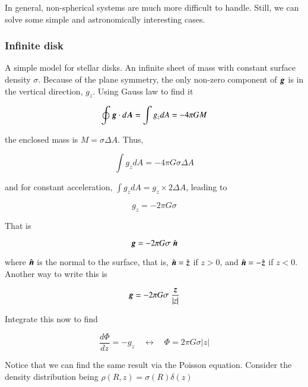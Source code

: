 In general, non-spherical systems are much more difficult to handle. Still, we can solve some simple and astronomically interesting cases. 

\subsubsection{Infinite disk}

A simple model for stellar disks. An infinite sheet of mass with constant surface density $\sigma$. Because of the plane symmetry, the only non-zero component of ${\boldsymbol{g}}$ is in the vertical direction, $g_z$. Using Gauss law to find it 

\begin{equation}
\oint {\boldsymbol{g}} \cdot d{\boldsymbol{A}} = \int g_z dA =  -4\pi G M 
\end{equation}

the enclosed mass is $M = \sigma \Delta A$. Thus, 

\begin{equation}
\int g_z dA  = -4\pi G \sigma \Delta A  
\end{equation}

and for constant acceleration, $\int g_z dA = g_z \times 2 \Delta A $, leading to 

\begin{equation}
g_z  = -2\pi G \sigma  
\end{equation}

That is 

\begin{equation}
\v{g}  = -2\pi G \sigma \ \hat{\v{n}}
\end{equation}

where $\hat{{\boldsymbol{n}}}$ is the normal to the surface, that is, $\hat{{\boldsymbol{n}}} = \hat{{\boldsymbol{z}}}$ if $z>0$, and $\hat{{\boldsymbol{n}}} = -\hat{{\boldsymbol{z}}}$ if $z<0$.  Another way to write this is 

\begin{equation}
\v{g}  = -2\pi G \sigma \ \frac{\v{z}}{|z|}
\end{equation}

Integrate this now to find 

\begin{equation}
\frac{d\varPhi}{dz}  = -g_z \quad \longleftrightarrow \quad\varPhi = 2\pi G \sigma |z|
\end{equation}


Notice that we can find the same result via the Poisson equation. Consider the density distribution being $\rho(R,z) = \sigma(R) \delta(z)$

